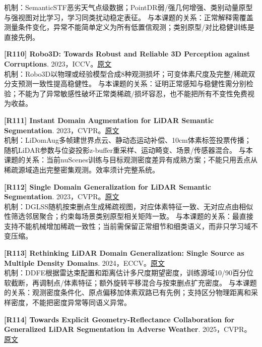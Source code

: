 \documentclass[11pt,a4paper]{article}
\begin{document}
机制：SemanticSTF恶劣天气点级数据；PointDR弱/强几何增强、类别动量原型与强视图对比学习，学习同类扰动稳定表征。 与本课题的关系：正常解释需覆盖测量条件变化，异常不能简单定义为所有低置信观测；类别原型/对比稳健训练是直接先例。\par\medskip
\hypertarget{R110}{}\textbf{[R110] Robo3D: Towards Robust and Reliable 3D Perception against Corruptions}. 2023，ICCV。\href{https://openaccess.thecvf.com/content/ICCV2023/papers/Kong_Robo3D_Towards_Robust_and_Reliable_3D_Perception_against_Corruptions_ICCV_2023_paper.pdf}{原文}\\
机制：Robo3D以物理或经验模型合成8种观测损坏；可变体素尺度及完整/稀疏双分支预测一致性提高稳健性。 与本课题的关系：证明正常感知与稳健性需分别检验；不能为了异常敏感性破坏正常类稀疏/损坏容忍，也不能把所有不变性免费视为收益。\par\medskip
\hypertarget{R111}{}\textbf{[R111] Instant Domain Augmentation for LiDAR Semantic Segmentation}. 2023，CVPR。\href{https://openaccess.thecvf.com/content/CVPR2023/papers/Ryu_Instant_Domain_Augmentation_for_LiDAR_Semantic_Segmentation_CVPR_2023_paper.pdf}{原文}\\
机制：LiDomAug多帧建世界点云、静动态运动补偿、10cm体素标签投票传播；随机LiDAR参数与位姿投影z-buffer重采样、运动畸变、场景/传感器混合。 与本课题的关系：当前nuScenes训练与目标观测密度差异有成熟方案；不能只用丢点从稀疏源域造出完整密集观测。效率须计完整系统。\par\medskip
\hypertarget{R112}{}\textbf{[R112] Single Domain Generalization for LiDAR Semantic Segmentation}. 2023，CVPR。\href{https://openaccess.thecvf.com/content/CVPR2023/papers/Kim_Single_Domain_Generalization_for_LiDAR_Semantic_Segmentation_CVPR_2023_paper.pdf}{原文}\\
机制：DGLSS随机按束删点生成稀疏视图，对应体素特征一致、无对应点由相似性筛选邻居聚合；约束每场景类别原型相关矩阵一致。 与本课题的关系：最直接支持不能机械增加稀疏一致性；当前需保留正常细节和细类语义，而非只学习域不变压缩。\par\medskip
\hypertarget{R113}{}\textbf{[R113] Rethinking LiDAR Domain Generalization: Single Source as Multiple Density Domains}. 2024，ECCV。\href{https://arxiv.org/pdf/2312.12098}{原文}\\
机制：DDFE根据雷达束配置和距离估计多尺度期望密度，训练源域10/90百分位软截断，再调制点/体素特征；额外旋转平移混合与按束删点扩充密度。 与本课题的关系：观测密度条件化、原点偏移加体素双路已有先例；支持区分物理距离和采样密度，不能把密度异常等同语义异常。\par\medskip
\hypertarget{R114}{}\textbf{[R114] Towards Explicit Geometry-Reflectance Collaboration for Generalized LiDAR Segmentation in Adverse Weather}. 2025，CVPR。\href{https://arxiv.org/pdf/2506.02396}{原文}\\
\end{document}
